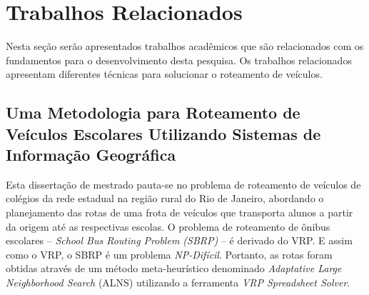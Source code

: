 \section{Trabalhos Relacionados}
\label{relacionados}
Nesta seção serão apresentados trabalhos acadêmicos que são relacionados com os fundamentos para o desenvolvimento desta pesquisa. Os trabalhos relacionados apresentam diferentes técnicas para solucionar o roteamento de veículos.

\subsection{Uma Metodologia para Roteamento de Veículos Escolares Utilizando Sistemas de Informação Geográfica \cite{maxwell}} 

Esta dissertação de mestrado pauta-se no problema de roteamento de veículos de colégios da rede estadual na região rural do Rio de Janeiro, abordando o planejamento das rotas de uma frota de veículos que transporta alunos a partir da origem até as respectivas escolas. O problema de roteamento de ônibus escolares -- \emph{School Bus Routing Problem (SBRP)} -- é derivado do VRP. E assim como o VRP, o SBRP é um problema \emph{NP-Difícil}. Portanto, as rotas foram obtidas através de um método meta-heurístico denominado \emph{Adaptative Large Neighborhood Search} (ALNS) utilizando a ferramenta \emph{VRP Spreadsheet Solver}.

